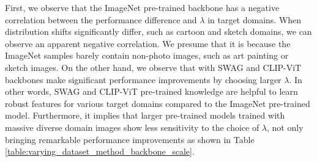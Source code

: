 First, we observe that the ImageNet pre-trained backbone has a negative correlation between the performance difference and $\lambda$ in target domains. When distribution shifts significantly differ, such as cartoon and sketch domains, we can observe an apparent negative correlation. We presume that it is because the ImageNet samples barely contain non-photo images, such as art painting or sketch images. On the other hand, we observe that \method{} with SWAG and CLIP-ViT backbones make significant performance improvements by choosing larger $\lambda$. In other words, SWAG and CLIP-ViT pre-trained knowledge are helpful to learn robust features for various target domains compared to the ImageNet pre-trained model. Furthermore, it implies that larger pre-trained models trained with massive diverse domain images show less sensitivity to the choice of $\lambda$, not only bringing remarkable performance improvements as shown in Table \ref{table:varying_dataset_method_backbone_scale}.
